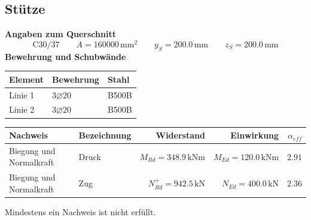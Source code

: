 \documentclass[11pt,a4paper]{article}
\begin{document}
\subsection{Stütze}
\noindent\textbf{Angaben zum Querschnitt}
\begin{equation*}
\text{C30/37} \qquad A = 160000\,\mathrm{mm}^2 \qquad y_S = 200.0\,\mathrm{mm} \qquad z_S = 200.0\,\mathrm{mm}
\end{equation*}
\noindent\textbf{Bewehrung und Schubwände}
\begin{longtable}{lll}
\hline
Element & Bewehrung & Stahl \\
\hline
\endhead
Linie 1 & $3 \varnothing 20$ & B500B \\
Linie 2 & $3 \varnothing 20$ & B500B \\
\hline
\end{longtable}
\begin{xltabular}{\linewidth}{>{\raggedright\arraybackslash}X>{\raggedright\arraybackslash}Xrrr}
\hline
Nachweis & Bezeichnung & Widerstand & Einwirkung & $\alpha_{eff}$ \\
\hline
\endhead
Biegung und Normalkraft & Druck & $M_{Rd} = 348.9\,\mathrm{kNm}$ & $M_{Ed} = 120.0\,\mathrm{kNm}$ & $2.91$ \\
Biegung und Normalkraft & Zug & $N_{Rd}^{+} = 942.5\,\mathrm{kN}$ & $N_{Ed} = 400.0\,\mathrm{kN}$ & $2.36$ \\
\hline
\end{xltabular}
Mindestens ein Nachweis ist nicht erfüllt.
\end{document}
